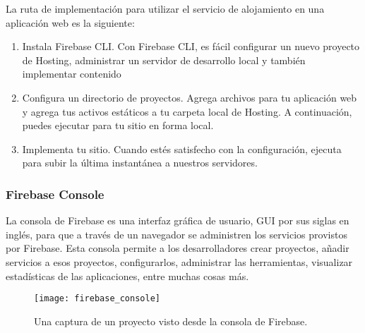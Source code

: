 La ruta de implementación para utilizar el servicio de alojamiento 
en una aplicación web es la siguiente:

\begin{enumerate}
\item {} 
Instala Firebase CLI. Con Firebase CLI, es fácil configurar un nuevo proyecto de Hosting, administrar un servidor de desarrollo local y también implementar contenido

\item {} 
Configura un directorio de proyectos. Agrega archivos para tu aplicación web y agrega tus activos estáticos a tu carpeta local de Hosting. A continuación, puedes ejecutar  para tu sitio en forma local.

\item {} 
Implementa tu sitio. Cuando estés satisfecho con la configuración, ejecuta  para subir la última instantánea a nuestros servidores.

\end{enumerate}


\subsubsection{Firebase Console}

La consola de Firebase es una interfaz gráfica de usuario, GUI por sus 
siglas en inglés, para que a través de un navegador se administren
los servicios provistos por Firebase. Esta consola permite a los desarrolladores
crear proyectos, añadir servicios a esos proyectos,
configurarlos, administrar las herramientas, visualizar estadísticas
de las aplicaciones, entre muchas cosas más.

\begin{figure}[ht]
\centering
\caption{Una captura de un proyecto visto desde la consola
de Firebase.}
\texttt{[image: firebase\_console]}
\end{figure}
